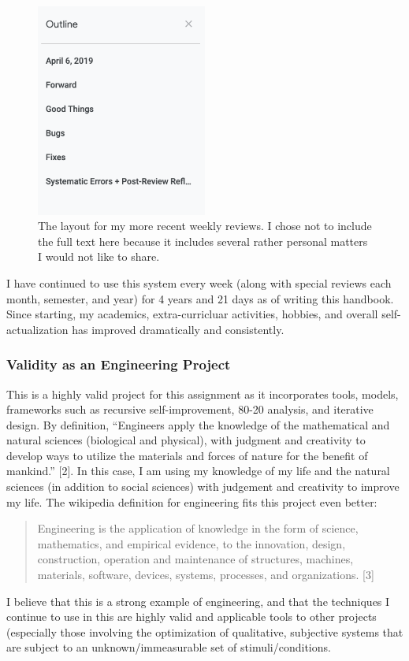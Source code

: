 \documentclass[a4paper,12pt]{article}
\begin{document}
\begin{figure}[H]
\centering
\includegraphics[width=0.5\textwidth]{img/image022.png}
\caption{The layout for my more recent weekly reviews. I chose not to include the full text here because it includes several rather personal matters I would not like to share.}
\label{}
\end{figure}

I have continued to use this system every week (along with special reviews each month, semester, and year) for 4 years and 21 days as of writing this handbook. Since starting, my academics, extra-curricluar activities, hobbies, and overall self-actualization has improved dramatically and consistently.

\subsubsection{Validity as an Engineering Project}

This is a highly valid project for this assignment as it incorporates tools, models, frameworks such as recursive self-improvement, 80-20 analysis, and iterative design. By definition, “Engineers apply the knowledge of the mathematical and natural sciences (biological and physical), with judgment and creativity to develop ways to utilize the materials and forces of nature for the benefit of mankind.” [2]. In this case, I am using my knowledge of my life and the natural sciences (in addition to social sciences) with judgement and creativity to improve my life. The wikipedia definition for engineering fits this project even better:
\begin{quote}
Engineering is the application of knowledge in the form of science, mathematics, and empirical evidence, to the innovation, design, construction, operation and maintenance of structures, machines, materials, software, devices, systems, processes, and organizations. [3]
\end{quote}
I believe that this is a strong example of engineering, and that the techniques I continue to use in this are highly valid and applicable tools to other projects (especially those involving the optimization of qualitative, subjective systems that are subject to an unknown/immeasurable set of stimuli/conditions.
\end{document}
